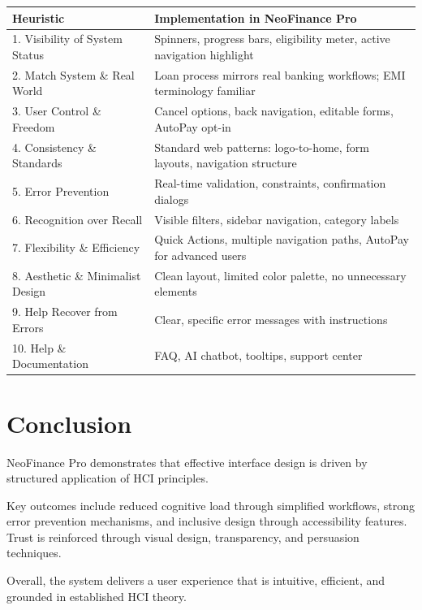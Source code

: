 \documentclass[11pt,a4paper]{article}
\begin{document}
\begin{table}[H]
\centering\small
\begin{tabularx}{\textwidth}{l X}
\toprule
\textbf{Heuristic} & \textbf{Implementation in NeoFinance Pro} \\
\midrule

1. Visibility of System Status &
Spinners, progress bars, eligibility meter, active navigation highlight \\

2. Match System \& Real World &
Loan process mirrors real banking workflows; EMI terminology familiar \\

3. User Control \& Freedom &
Cancel options, back navigation, editable forms, AutoPay opt-in \\

4. Consistency \& Standards &
Standard web patterns: logo-to-home, form layouts, navigation structure \\

5. Error Prevention &
Real-time validation, constraints, confirmation dialogs \\

6. Recognition over Recall &
Visible filters, sidebar navigation, category labels \\

7. Flexibility \& Efficiency &
Quick Actions, multiple navigation paths, AutoPay for advanced users \\

8. Aesthetic \& Minimalist Design &
Clean layout, limited color palette, no unnecessary elements \\

9. Help Recover from Errors &
Clear, specific error messages with instructions \\

10. Help \& Documentation &
FAQ, AI chatbot, tooltips, support center \\

\bottomrule
\end{tabularx}
\end{table}


\section{Conclusion}

NeoFinance Pro demonstrates that effective interface design is driven by structured application of HCI principles.

Key outcomes include reduced cognitive load through simplified workflows, strong error prevention mechanisms, and inclusive design through accessibility features. Trust is reinforced through visual design, transparency, and persuasion techniques.

Overall, the system delivers a user experience that is intuitive, efficient, and grounded in established HCI theory.
\end{document}
